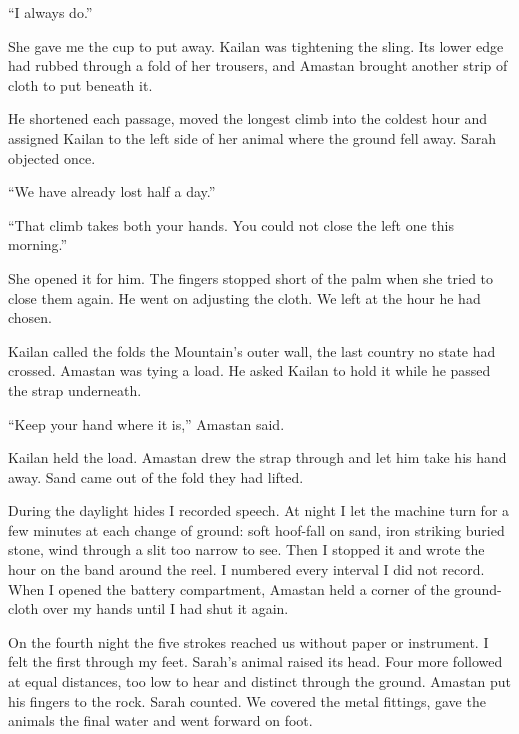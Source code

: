 ``I always do.''\par

She gave me the cup to put away. Kailan was tightening the sling. Its lower edge had rubbed through a fold of her trousers, and Amastan brought another strip of cloth to put beneath it.\par

He shortened each passage, moved the longest climb into the coldest hour and assigned Kailan to the left side of her animal where the ground fell away. Sarah objected once.\par

``We have already lost half a day.''\par

``That climb takes both your hands. You could not close the left one this morning.''\par

She opened it for him. The fingers stopped short of the palm when she tried to close them again. He went on adjusting the cloth. We left at the hour he had chosen.\par

Kailan called the folds the Mountain's outer wall, the last country no state had crossed. Amastan was tying a load. He asked Kailan to hold it while he passed the strap underneath.\par

``Keep your hand where it is,'' Amastan said.\par

Kailan held the load. Amastan drew the strap through and let him take his hand away. Sand came out of the fold they had lifted.\par

During the daylight hides I recorded speech. At night I let the machine turn for a few minutes at each change of ground: soft hoof-fall on sand, iron striking buried stone, wind through a slit too narrow to see. Then I stopped it and wrote the hour on the band around the reel. I numbered every interval I did not record. When I opened the battery compartment, Amastan held a corner of the ground-cloth over my hands until I had shut it again.\par

On the fourth night the five strokes reached us without paper or instrument. I felt the first through my feet. Sarah's animal raised its head. Four more followed at equal distances, too low to hear and distinct through the ground. Amastan put his fingers to the rock. Sarah counted. We covered the metal fittings, gave the animals the final water and went forward on foot.\par

